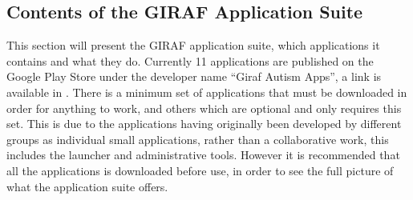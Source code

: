 \subsection{Contents of the GIRAF Application Suite}
This section will present the GIRAF application suite, which applications it contains and what they do.
Currently 11 applications are published on the Google Play Store under the developer name ``Giraf Autism Apps'', a link is available in \cite{GIRAFGOOGLEPLAY}.
There is a minimum set of applications that must be downloaded in order for anything to work, and others which are optional and only requires this set.
This is due to the applications having originally been developed by different groups as individual small applications, rather than a collaborative work, this includes the launcher and administrative tools.
However it is recommended that all the applications is downloaded before use, in order to see the full picture of what the application suite offers.
